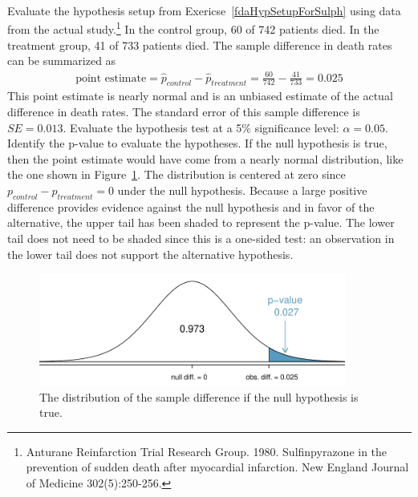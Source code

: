 \begin{example}{Evaluate the hypothesis setup from Exericse~\ref{fdaHypSetupForSulph} using data from the actual study.\footnote{Anturane Reinfarction Trial Research Group. 1980. Sulfinpyrazone in the prevention of sudden death after myocardial infarction. New England Journal of Medicine 302(5):250-256.} In the control group, 60 of 742 patients died. In the treatment group, 41 of 733 patients died. The sample difference in death rates can be summarized as
\begin{eqnarray*}
\text{point estimate} = \hat{p}_{control} - \hat{p}_{treatment} = \frac{60}{742} - \frac{41}{733} = 0.025
\end{eqnarray*}
This point estimate is nearly normal and is an unbiased estimate of the actual difference in death rates. The standard error of this sample difference is $SE = 0.013$. Evaluate the hypothesis test at a 5\% significance level: $\alpha=0.05$.}
Identify the p-value to evaluate the hypotheses. If the null hypothesis is true, then the point estimate would have come from a nearly normal distribution, like the one shown in Figure~\ref{sulphStudyFindPValueUsingNormalApprox}. The distribution is centered at zero since $p_{control}-p_{treatment}=0$ under the null hypothesis. Because a large positive difference provides evidence against the null hypothesis and in favor of the alternative, the upper tail has been shaded to represent the p-value. The lower tail does not need to be shaded since this is a one-sided test: an observation in the lower tail does not support the alternative hypothesis.

\begin{figure}[bt]
   \centering
   \includegraphics[height=37mm]{ch_inference_foundations_oi_biostat/figures/sulphStudyFindPValueUsingNormalApprox/sulphStudyFindPValueUsingNormalApprox}
   \caption{The distribution of the sample difference if the null hypothesis is true.}
   \label{sulphStudyFindPValueUsingNormalApprox}
\end{figure}


\end{example}

